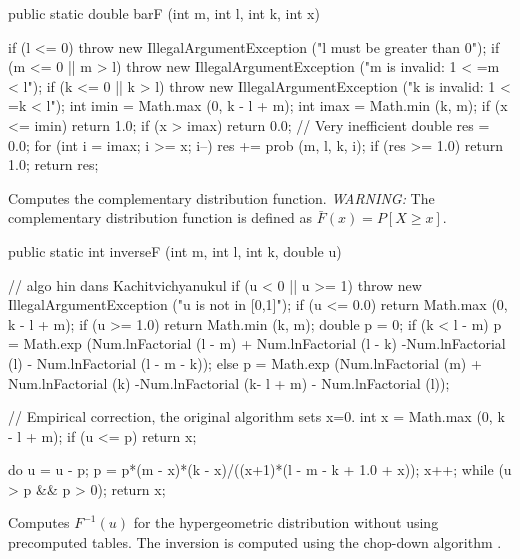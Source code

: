 \begin{code}

   public static double barF (int m, int l, int k, int x)\begin{hide} {
      if (l <= 0)
         throw new IllegalArgumentException ("l must be greater than 0");
      if (m <= 0 || m > l)
         throw new IllegalArgumentException ("m is invalid: 1 < =m < l");
      if (k <= 0 || k > l)
         throw new IllegalArgumentException ("k is invalid: 1 < =k < l");
      int imin = Math.max (0, k - l + m);
      int imax = Math.min (k, m);
      if (x <= imin)
         return 1.0;
      if (x > imax)
         return 0.0;
      // Very inefficient
      double res = 0.0;
      for (int i = imax; i >= x; i--)
         res += prob (m, l, k, i);
      if (res >= 1.0)
         return 1.0;
      return res;
   }\end{hide}
\end{code}
\begin{tabb} Computes the complementary distribution function.
\emph{WARNING:} The complementary distribution function is defined as
$\bar F(x) = P[X \ge x]$.
\end{tabb}
\begin{code}

   public static int inverseF (int m, int l, int k, double u)\begin{hide} {
      // algo hin dans Kachitvichyanukul
      if (u < 0 || u >= 1)
         throw new IllegalArgumentException ("u is not in [0,1]");
      if (u <= 0.0)
         return Math.max (0, k - l + m);
      if (u >= 1.0)
         return Math.min (k, m);
      double p = 0;
      if (k < l - m)
          p = Math.exp (Num.lnFactorial (l - m) + Num.lnFactorial (l - k)
                       -Num.lnFactorial (l) - Num.lnFactorial (l - m - k));
      else
          p = Math.exp (Num.lnFactorial (m) + Num.lnFactorial (k)
                      -Num.lnFactorial (k- l + m) - Num.lnFactorial (l));

     // Empirical correction, the original algorithm sets x=0.
     int x = Math.max (0, k - l + m);
     if (u <= p) return x;

     do {
         u = u - p;
         p = p*(m - x)*(k - x)/((x+1)*(l - m - k + 1.0 + x));
         x++;
     } while (u > p && p > 0);
     return x;
   }\end{hide}
\end{code}
\begin{tabb}
  Computes $F^{-1}(u)$ for the hypergeometric distribution without
  using precomputed tables.  The inversion is computed
  using the chop-down algorithm \cite{sKAC85a}.
\end{tabb}
